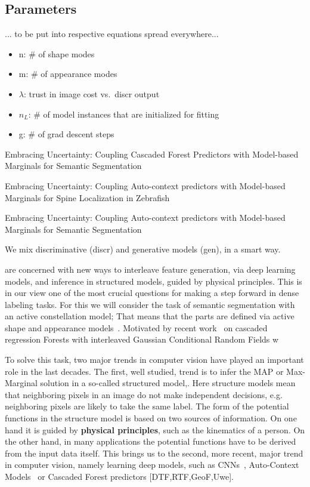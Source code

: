 \subsection{Parameters}
... to be put into respective equations spread everywhere...
\begin{itemize}
\item n: \# of shape modes
\item m: \# of appearance modes
\item $\lambda$: trust in image cost vs.\ discr output
\item $n_L$: \# of model instances that are initialized for fitting
\item g: \# of grad descent steps
\end{itemize}



Embracing Uncertainty: Coupling Cascaded Forest Predictors with
Model-based Marginals for Semantic Segmentation

Embracing Uncertainty: Coupling Auto-context predictors with
Model-based Marginals for Spine Localization in Zebrafish

Embracing Uncertainty: Coupling Auto-context predictors with
Model-based Marginals for Semantic Segmentation

   We mix discriminative (discr) and generative models (gen), in a smart way.

are concerned with new ways to interleave feature generation, via deep learning models, and inference in structured models, guided by physical principles. This is in our view one of the most crucial questions for making a step forward in dense labeling tasks. For this we will consider the task of semantic segmentation with an active constellation model; That means that the parts are defined via active shape and appearance models~\cite{CootesAAM2001}. Motivated by recent work~\cite{UweCVPR2013} on cascaded regression Forests with interleaved Gaussian Conditional Random Fields w

To solve this task, two major trends in computer vision have played an important role in the last decades.  The first, well studied, trend is to infer the MAP or Max-Marginal solution in a so-called structured model,. Here structure models mean that neighboring pixels in an image do not make independent decisions, e.g. neighboring pixels are likely to take the same label. The form of the potential functions in the structure model is based on two sources of information.  On one hand it is guided by {\bf physical principles}, such as the kinematics of a person. On the other hand, in many applications the potential functions have to be derived from the input data itself. This brings us to the second, more recent, major trend in computer vision, namely learning deep models, such as CNNs~\cite{NIPS2012_4824}, Auto-Context Models~\cite{AutoContext2008,PoseMachinesECCV2014} or Cascaded Forest predictors [DTF,RTF,GeoF,Uwe]. 

